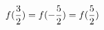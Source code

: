 \documentclass[preview]{standalone}
\begin{document}
\begin{align*}
\special{dvisvgm:raw <g id='unique000'>}f(\frac{3}{2})=f(-\frac{5}{2})=f(\frac{5}{2})\special{dvisvgm:raw </g>}
\end{align*}
\end{document}
